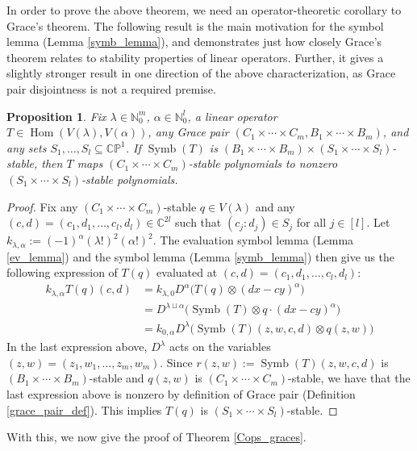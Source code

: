 \documentclass{article}
\newtheorem{proposition}[theorem]{Proposition}
\theoremstyle{definition}
\theoremstyle{plain}
\newcommand{\C}{\mathbb{C}}
\newcommand{\N}{\mathbb{N}}
\newcommand{\CP}{\mathbb{CP}}
\DeclareMathOperator{\Symb}{Symb}
\DeclareMathOperator{\Hom}{Hom}
\begin{document}
In order to prove the above theorem, we need an operator-theoretic corollary to Grace's theorem. The following result is the main motivation for the symbol lemma (Lemma \ref{symb_lemma}), and demonstrates just how closely Grace's theorem relates to stability properties of linear operators. Further, it gives a slightly stronger result in one direction of the above characterization, as Grace pair disjointness is not a required premise.

\begin{proposition}\label{Cops_prop}
    Fix $\lambda \in \N_0^m$, $\alpha \in \N_0^l$, a linear operator $T \in \Hom(V(\lambda),V(\alpha))$, any Grace pair $(C_1 \times \cdots \times C_m, B_1 \times \cdots \times B_m)$, and any sets $S_1,\ldots,S_l \subseteq \CP^1$. If $\Symb(T)$ is $(B_1 \times \cdots \times B_m) \times (S_1 \times \cdots \times S_l)$-stable, then $T$ maps $(C_1 \times \cdots \times C_m)$-stable polynomials to nonzero $(S_1 \times \cdots \times S_l)$-stable polynomials.
\end{proposition}
\begin{proof}
    Fix any $(C_1 \times \cdots \times C_m)$-stable $q \in V(\lambda)$ and any $(c,d) = (c_1,d_1,\ldots,c_l,d_l) \in \C^{2l}$ such that $(c_j:d_j) \in S_j$ for all $j \in [l]$. Let $k_{\lambda,\alpha} := (-1)^\alpha(\lambda!)^2(\alpha!)^2$. The evaluation symbol lemma (Lemma \ref{ev_lemma}) and the symbol lemma (Lemma \ref{symb_lemma}) then give us the following expression of $T(q)$ evaluated at $(c,d) = (c_1,d_1,\ldots,c_l,d_l)$:
    \[
        \begin{split}
            k_{\lambda,\alpha} T(q)(c,d) &= k_{\lambda,0} D^\alpha\big(T(q) \otimes (dx-cy)^\alpha\big) \\
                &= D^{\lambda \sqcup \alpha}\big(\Symb(T) \otimes q \cdot (dx-cy)^\alpha\big) \\
                &= k_{0,\alpha} D^\lambda\big(\Symb(T)(z,w,c,d) \otimes q(z,w)\big)
        \end{split}
    \]
    In the last expression above, $D^\lambda$ acts on the variables $(z,w) = (z_1,w_1,\ldots,z_m,w_m)$. Since $r(z,w) := \Symb(T)(z,w,c,d)$ is $(B_1 \times \cdots \times B_m)$-stable and $q(z,w)$ is $(C_1 \times \cdots \times C_m)$-stable, we have that the last expression above is nonzero by definition of Grace pair (Definition \ref{grace_pair_def}). This implies $T(q)$ is $(S_1 \times \cdots \times S_l)$-stable.
\end{proof}

With this, we now give the proof of Theorem \ref{Cops_graces}.
\end{document}
